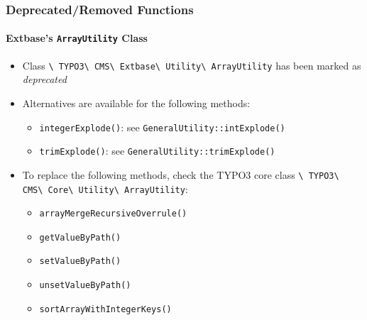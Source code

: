 \begin{frame}[fragile]
	\frametitle{Deprecated/Removed Functions}
	\framesubtitle{Extbase's \texttt{ArrayUtility} Class}

	\begin{itemize}
		\item Class
			\texttt{\textbackslash
				TYPO3\textbackslash
				CMS\textbackslash
				Extbase\textbackslash
				Utility\textbackslash
				ArrayUtility} has been marked as \textit{deprecated}

		\item Alternatives are available for the following methods:

			\begin{itemize}
				\item \texttt{integerExplode()}: see \texttt{GeneralUtility::intExplode()}
				\item \texttt{trimExplode()}: see \texttt{GeneralUtility::trimExplode()}
			\end{itemize}

		\item To replace the following methods, check the TYPO3 core class
			\texttt{\textbackslash
				TYPO3\textbackslash
				CMS\textbackslash
				Core\textbackslash
				Utility\textbackslash
				ArrayUtility}:

			\begin{itemize}
				\item \texttt{arrayMergeRecursiveOverrule()}
				\item \texttt{getValueByPath()}
				\item \texttt{setValueByPath()}
				\item \texttt{unsetValueByPath()}
				\item \texttt{sortArrayWithIntegerKeys()}
			\end{itemize}

	\end{itemize}

\end{frame}





